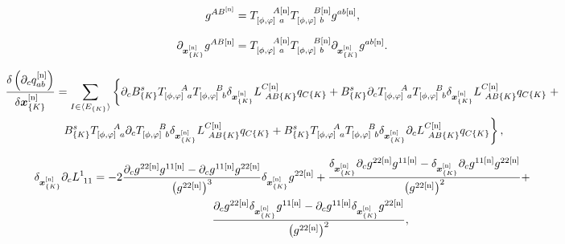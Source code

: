 \begin{equation} \label{B.32}
	g^{AB^{[\textup{n}]}} = T_{[\phi,\varphi]~a}^{~~~~A{[\textup{n}]}} T_{[\phi,\varphi]~b}^{~~~~B{[\textup{n}]}}g^{ab{[\textup{n}]}} ,
\end{equation}

\begin{equation} \label{B.33}
	\partial_{\bm{x}_{\{K\}}^{[\textup{n}]}} g^{AB{[\textup{n}]}} =  T_{[\phi,\varphi]~a}^{~~~~A{[\textup{n}]}} T_{[\phi,\varphi]~b}^{~~~~B{[\textup{n}]}} \partial_{\bm{x}_{\{K\}}^{[\textup{n}]}}g^{ab{[\textup{n}]}}.
\end{equation}



\begin{gather} \label{B.33}
	\frac{\delta  \left(\partial_c q_{ab}^{[\textup{n}]}\right)}{\delta  \bm{x}_{\{K\}}^{[\textup{n}]}} =  \sum_{I\in\langle E_{\{K\}} \rangle} \left\{\partial_cB_{\{K\}}^{s} T_{[\phi,\varphi]~a}^{~~~~A} T_{[\phi,\varphi]~b}^{~~~~B} \delta_{\bm{x}_{\{K\}}^{[\textup{n}]}} L_{~AB\{K\}}^{C[\textup{n}]} q_{C\{K\}} + B_{\{K\}}^{s} \partial_cT_{[\phi,\varphi]~a}^{~~~~A} T_{[\phi,\varphi]~b}^{~~~~B} \delta_{\bm{x}_{\{K\}}^{[\textup{n}]}} L_{~AB\{K\}}^{C[\textup{n}]} q_{C\{K\}} \right. \nonumber +\\
	\left.\,B_{\{K\}}^{s} T_{[\phi,\varphi]~a}^{~~~~A} \partial_cT_{[\phi,\varphi]~b}^{~~~~B} \delta_{\bm{x}_{\{K\}}^{[\textup{n}]}} L_{~AB\{K\}}^{C[\textup{n}]} q_{C\{K\}} +B_{\{K\}}^{s}  T_{[\phi,\varphi]~a}^{~~~~A} T_{[\phi,\varphi]~b}^{~~~~B}\delta_{\bm{x}_{\{K\}}^{[\textup{n}]}} \partial_c  L_{~AB\{K\}}^{C[\textup{n}]}q_{C\{K\}}\right\},
\end{gather}

\begin{gather}  \label{B.34}
	\delta_{\bm{x}_{\{K\}}^{[\textup{n}]}} \partial_c  L_{~11}^1 =  -2\frac{\partial_c g^{22[\textup{n}]} g^{11[\textup{n}]} - \partial_cg^{11[\textup{n}]}g^{22[\textup{n}]}}{\left(g^{22[\textup{n}]}\right)^3} \delta_{\bm{x}_{\{K\}}^{[\textup{n}]}} g^{22[\textup{n}]} +   \frac{\delta_{\bm{x}_{\{K\}}^{[\textup{n}]}} \partial_c g^{22[\textup{n}]} g^{11[\textup{n}]} - \delta_{\bm{x}_{\{K\}}^{[\textup{n}]}}  \partial_cg^{11[\textup{n}]}g^{22[\textup{n}]}}{\left(g^{22[\textup{n}]}\right)^2} + \nonumber \\ \qquad \qquad \quad
	\frac{ \partial_c g^{22[\textup{n}]}\delta_{\bm{x}_{\{K\}}^{[\textup{n}]}} g^{11[\textup{n}]} - \partial_cg^{11[\textup{n}]}\delta_{\bm{x}_{\{K\}}^{[\textup{n}]}}g^{22[\textup{n}]}}{\left(g^{22[\textup{n}]}\right)^2},
\end{gather}


